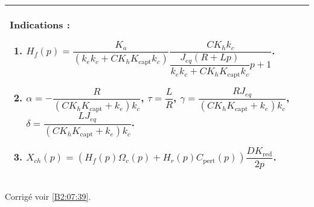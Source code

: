 \ifprof
\else
\footnotesize
\noindent \begin{tabular}{|p{\linewidth}|}
\hline
Indications : 
\begin{enumerate}
\item $ H_f(p)=
\dfrac{K_a }{\left( k_ek_c+CK_hK_{\text{capt}} k_c\right)} \dfrac{CK_h k_c}{\dfrac{J_{eq}\left(R+Lp\right)}{k_ek_c+CK_hK_{\text{capt}} k_c}p+1} $.
\item  $\alpha = - \dfrac{R}{\left( C K_h K_{\text{capt}}+k_e\right) k_c}$,  $\tau = \dfrac{L}{R}$, 
$\gamma = \dfrac{R J_{eq}}{\left( C K_h K_{\text{capt}}+k_e\right) k_c} $, 
$\delta = \dfrac{LJ_{eq}}{\left( C K_h K_{\text{capt}}+k_e\right) k_c}$.
\item $X_{ch}(p)=\left(H_f(p) \Omega_c(p) + H_r(p) C_{\text{pert}}(p)\right) \dfrac{DK_{\text{red}}}{2p}$.
\end{enumerate}
\\ \hline
\end{tabular}
\normalsize

\begin{flushright}
\footnotesize{Corrigé  voir \ref{B2:07:39}.}
\end{flushright}%
\fi